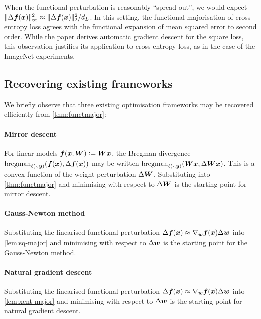 When the functional perturbation is reasonably ``spread out'', we would expect $\Vert {\Delta {\bm{f}}({\bm{x}})} \Vert_\infty^2 \approx \Vert {\Delta {\bm{f}}({\bm{x}})} \Vert_2^2/d_L$. In this setting, the functional majorisation of cross-entropy loss agrees with the functional expansion of mean squared error to second order. While the paper derives automatic gradient descent for the square loss, this observation justifies its application to cross-entropy loss, as in the case of the ImageNet experiments.

\subsection{Recovering existing frameworks}
\label{sec:recover}

We briefly observe that three existing optimisation frameworks may be recovered efficiently from \cref{thm:functmajor}:

\paragraph{Mirror descent} For linear models ${\bm{f}}({\bm{x}};{\bm{W}}) \vcentcolon= {\bm{W}} {\bm{x}}$, the Bregman divergence $\operatorname{bregman}_{\ell(\cdot,{\bm{y}})}({\bm{f}}({\bm{x}}), \Delta {\bm{f}}({\bm{x}}))$ may be written $\operatorname{bregman}_{\ell(\cdot,{\bm{y}})}({\bm{W}}{\bm{x}}, \Delta{\bm{W}}{\bm{x}})$. This is a convex function of the weight perturbation $\Delta {\bm{W}}$. Substituting into \cref{thm:functmajor} and minimising with respect to $\Delta {\bm{W}}$ is the starting point for mirror descent.

\paragraph{Gauss-Newton method} Substituting the linearised functional perturbation $\Delta {\bm{f}}({\bm{x}}) \approx \nabla_{\bm{w}} {\bm{f}}({\bm{x}}) \Delta {\bm{w}}$ into \cref{lem:sq-major} and minimising with respect to $\Delta {\bm{w}}$ is the starting point for the Gauss-Newton method.

\paragraph{Natural gradient descent} Substituting the linearised functional perturbation $\Delta {\bm{f}}({\bm{x}}) \approx \nabla_{\bm{w}} {\bm{f}}({\bm{x}}) \Delta {\bm{w}}$ into \cref{lem:xent-major} and minimising with respect to $\Delta {\bm{w}}$ is the starting point for natural gradient descent.